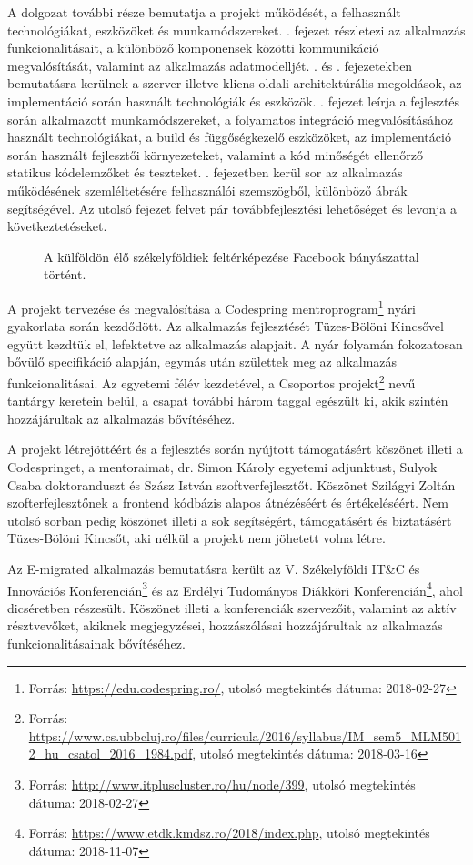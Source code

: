 A dolgozat további része bemutatja a projekt működését, a felhasznált technológiákat, eszközöket és munkamódszereket.  . fejezet részletezi az alkalmazás funkcionalitásait, a különböző komponensek közötti kommunikáció megvalósítását, valamint az alkalmazás adatmodelljét.  . és . fejezetekben bemutatásra kerülnek a szerver illetve kliens oldali architektúrális megoldások, az implementáció során használt technológiák és eszközök. . fejezet leírja a fejlesztés során alkalmazott munkamódszereket,  a folyamatos integráció megvalósításához használt technológiákat, a build és függőségkezelő eszközöket, az implementáció során használt fejlesztői környezeteket, valamint a kód minőségét ellenőrző statikus kódelemzőket és teszteket. . fejezetben kerül sor az alkalmazás működésének szemléltetésére felhasználói szemszögből, különböző ábrák segítségével. Az utolsó fejezet felvet pár továbbfejlesztési lehetőséget és levonja a következtetéseket. 
\begin{figure}
  \centering
  \caption{A külföldön élő székelyföldiek feltérképezése Facebook bányászattal történt.}
  \label{fig:szekely_diaszpora}
\end{figure}

A projekt tervezése és megvalósítása a Codespring mentroprogram\footnote{Forrás: \url{https://edu.codespring.ro/}, utolsó megtekintés dátuma: 2018-02-27} nyári gyakorlata során kezdődött. Az alkalmazás fejlesztését Tüzes-Bölöni Kincsővel együtt kezdtük el, lefektetve az alkalmazás alapjait. A nyár folyamán fokozatosan bővülő specifikáció alapján, egymás után születtek meg az alkalmazás funkcionalitásai. Az egyetemi félév kezdetével, a Csoportos projekt\footnote{Forrás: \url{https://www.cs.ubbcluj.ro/files/curricula/2016/syllabus/IM_sem5_MLM5012_hu_csatol_2016_1984.pdf}, utolsó megtekintés dátuma: 2018-03-16} nevű tantárgy keretein belül, a csapat további három taggal egészült ki, akik szintén hozzájárultak az alkalmazás bővítéséhez. 

A projekt létrejöttéért és a fejlesztés során nyújtott támogatásért köszönet illeti a Codespringet, a mentoraimat, dr. Simon Károly egyetemi adjunktust, Sulyok Csaba doktoranduszt és Szász István szoftverfejlesztőt. Köszönet Szilágyi Zoltán szofterfejlesztőnek a frontend kódbázis alapos átnézéséért és értékeléséért. Nem utolsó sorban pedig köszönet illeti a sok segítségért, támogatásért és biztatásért Tüzes-Bölöni Kincsőt, aki nélkül a projekt nem jöhetett volna létre. 

Az E-migrated alkalmazás bemutatásra került az V. Székelyföldi IT\&C és Innovációs Konferencián\footnote{Forrás: \url{http://www.itpluscluster.ro/hu/node/399}, utolsó megtekintés dátuma: 2018-02-27} és az Erdélyi Tudományos Diákköri Konferencián\footnote{Forrás: \url{https://www.etdk.kmdsz.ro/2018/index.php}, utolsó megtekintés dátuma: 2018-11-07}, ahol dicséretben részesült. Köszönet illeti a konferenciák szervezőit, valamint az aktív résztvevőket, akiknek megjegyzései, hozzászólásai hozzájárultak az alkalmazás funkcionalitásainak bővítéséhez. 


